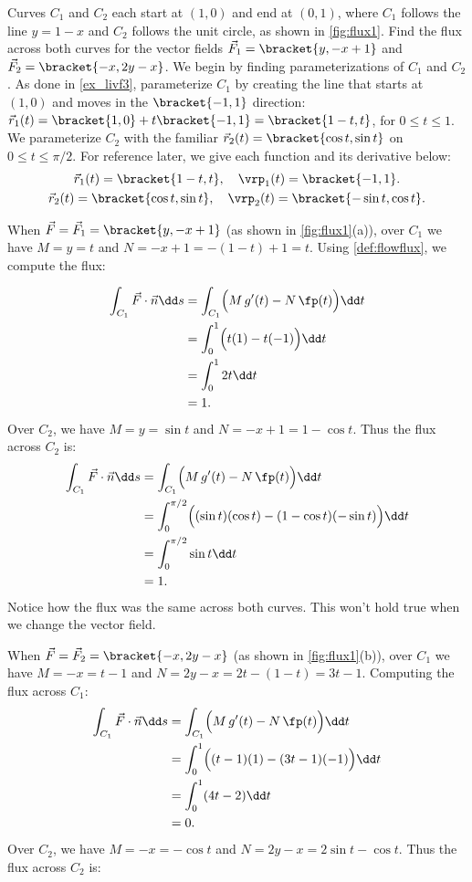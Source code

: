 \begin{example}\label{ex_flux1}
Curves $C_1$ and $C_2$ each start at $(1,0)$ and end at $(0,1)$, where $C_1$ follows the line $y=1-x$ and $C_2$ follows the unit circle, as shown in \autoref{fig:flux1}. Find the flux across both curves for the vector fields $\vec F_1 =\bracket{y,-x+1}$ and $\vec F_2 =\bracket{-x,2y-x}$.
\solution
We begin by finding parameterizations of $C_1$ and $C_2$. As done in \autoref{ex_livf3}, parameterize $C_1$ by creating the line that starts at $(1,0)$ and moves in the $\bracket{-1,1}$ direction: $\vec r_1(t) =\bracket{1,0}+t\bracket{-1,1}=\bracket{1-t,t}$, for $0\leq t\leq 1$. We parameterize $C_2$ with the familiar $\vec r_2(t) =\bracket{\cos t,\sin t}$ on $0\leq t\leq \pi/2$. For reference later, we give each function and its derivative below:
\begin{gather*}
\vec r_1(t) =\bracket{1-t,t},\quad\vrp_1(t)=\bracket{-1,1}.\\
\vec r_2(t) =\bracket{\cos t,\sin t}, \quad \vrp_2(t) =\bracket{-\sin t,\cos t}.
\end{gather*}

When $\vec F = \vec F_1 =\bracket{y,-x+1}$ (as shown in \autoref{fig:flux1}(a)), over $C_1$ we have $M = y =t$ and $N = -x+1 = -(1-t)+1 = t$. Using \autoref{def:flowflux}, we compute the flux:

\begin{align*}
\int_{C_1} \vec F\cdot \vec n\dd s & = \int_{C_1} \Bigl(M\,g'(t) - N\,\fp(t)\Bigr)\dd t\\
			&= \int_0^1 \Bigl( t(1) - t(-1)\Bigr)\dd t \\
			&= \int_0^1 2t\dd t\\
			&= 1.
\end{align*}
Over $C_2$, we have $M = y = \sin t$ and $N = -x+1 = 1-\cos t$. Thus the flux across $C_2$ is:
\begin{align*}
	\int_{C_1} \vec F\cdot \vec n\dd s
	& = \int_{C_1} \Bigl(M\,g'(t) - N\,\fp(t)\Bigr)\dd t\\
	&= \int_0^{\pi/2}\Bigl((\sin t)(\cos t) - (1-\cos t)(-\sin t)\Bigr)\dd t\\
	&= \int_0^{\pi/2} \sin t\dd t\\
	&=1.
\end{align*}
Notice how the flux was the same across both curves. This won't hold true when we change the vector field.

When $\vec F=\vec F_2=\bracket{-x,2y-x}$ (as shown in \autoref{fig:flux1}(b)), over $C_1$ we have $M=-x=t-1$ and $N=2y-x=2t-(1-t)=3t-1$. Computing the flux across $C_1$:
\begin{align*}
	\int_{C_1} \vec F\cdot \vec n\dd s
	& = \int_{C_1} \Bigl(M\,g'(t) - N\,\fp(t)\Bigr)\dd t\\
	&= \int_0^1 \Bigl( (t-1)(1) - (3t-1)(-1)\Bigr)\dd t \\
	&= \int_0^1 (4t-2)\dd t\\
	&= 0.
\end{align*}
Over $C_2$, we have $M = -x = -\cos t$ and $N = 2y-x = 2\sin t-\cos t$. Thus the flux across $C_2$ is:


\end{example}
